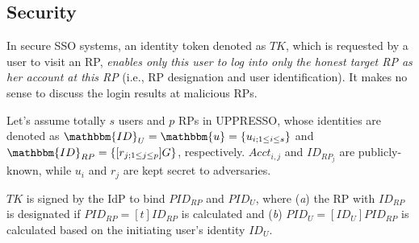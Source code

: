 

\subsection{Security}
\label{analysis-security}

In secure SSO systems, an identity token denoted as $TK$, which is requested by a user to visit an RP,
    \emph{enables only this user to log into only the honest target RP as her account at this RP} (i.e., RP designation and user identification). It makes no sense to discuss the login results at malicious RPs.

Let's assume totally $s$ users and $p$ RPs in UPPRESSO,
    whose identities are denoted as $\mathbbm{ID}_U = \mathbbm{u} = \{u_{i; 1 \leq i \leq s}\}$ and $\mathbbm{ID}_{RP} = \{[r_{j;1 \leq j \leq p}]G\}$, respectively.
$Acct_{i,j}$ and $ID_{RP_j}$ are publicly-known, while $u_{i}$ and $r_{j}$ are kept secret to adversaries.

$TK$ is signed by the IdP to bind $PID_{RP}$ and $PID_U$,
where (\emph{a}) the RP with $ID_{RP}$ is designated if $PID_{RP} = [t]ID_{RP}$ is calculated
    and (\emph{b}) $PID_U = [ID_U]PID_{RP}$ is calculated based on the initiating user's identity $ID_U$.

